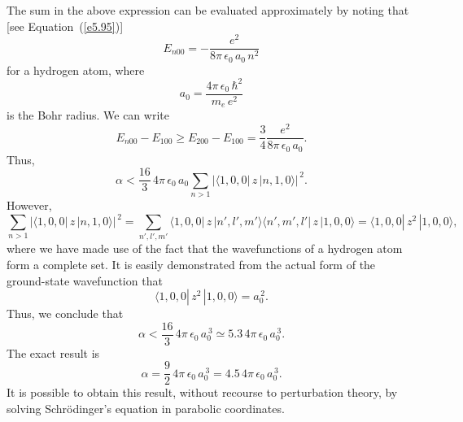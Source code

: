The sum in the above expression can be evaluated approximately by noting that
[see Equation~(\ref{e5.95})]
\begin{equation}
E_{n00} = - \frac{e^2}{8\pi\,\epsilon_0\, a_0\,n^2} 
\end{equation}
for a hydrogen atom,
where
\begin{equation}
a_0 = \frac{4\pi \,\epsilon_0 \,\hbar^2}{m_e \,e^2}
\end{equation}
is the  Bohr radius. We can write
\begin{equation}
E_{n00}-E_{100} \geq E_{200} - E_{100} = \frac{3}{4}
 \frac{e^2}{8\pi\,\epsilon_0\, a_0}.
\end{equation}
Thus, 
\begin{equation}
\alpha < \frac{16}{3}\, 4\pi \,\epsilon_0\, a_0  \sum_{n>1} 
|\langle 1,0,0|\,z\,|n,1,0\rangle|^{\,2}.
\end{equation}
However,
\begin{equation}
\sum_{n>1} 
|\langle 1,0,0|\,z\,|n,1,0\rangle|^{\,2} = \sum_{n',l',m'}
\langle 1,0,0|\,z\,|n',l',m'\rangle\langle n',m',l'|\,z\,|1,0,0\rangle= \langle 1,0,0|\,z^2\,|1,0,0\rangle,
\end{equation}
where we have made use of the fact that the wavefunctions of a hydrogen atom
form a complete set. It is easily demonstrated from the 
actual form of the ground-state wavefunction
that
\begin{equation}
\langle 1,0,0|\,z^2\,|1,0,0\rangle = a_0^{\,2}.
\end{equation}
Thus, we conclude that
\begin{equation}
\alpha <  \frac{16}{3} \,4\pi\, \epsilon_0\, a_0^{\,3} \simeq 5.3\,4\pi\, \epsilon_0 \,a_0^{\,3}.
\end{equation}
The exact result is
\begin{equation}
\alpha = \frac{9}{2}\, 4\pi\, \epsilon_0\, a_0^{\,3} = 4.5\,4\pi \,\epsilon_0 \,a_0^{\,3}.
\end{equation}
It is  possible to obtain this result, without recourse to perturbation
theory, by solving Schr\"{o}dinger's equation in parabolic coordinates.

